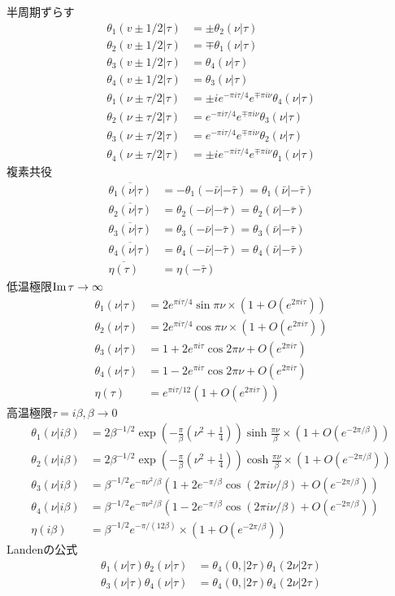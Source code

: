 半周期ずらす
\begin{align}
\theta_1(v\pm 1/2|\tau)&=\pm \theta_2(\nu|\tau)\\
\theta_2(v\pm 1/2|\tau)&=\mp \theta_1(\nu|\tau)\\
\theta_3(v\pm 1/2|\tau)&= \theta_4(\nu|\tau)\\
\theta_4(v\pm 1/2|\tau)&= \theta_3(\nu|\tau)\\
\theta_1(\nu\pm\tau/2|\tau)&=\pm ie^{-\pi i \tau/4}e^{\mp \pi i \nu}\theta_4(\nu|\tau)\\
\theta_2(\nu\pm\tau/2|\tau)&=e^{-\pi i \tau/4}e^{\mp \pi i \nu}\theta_3(\nu|\tau)\\
\theta_3(\nu\pm\tau/2|\tau)&=e^{-\pi i \tau/4}e^{\mp \pi i \nu}\theta_2(\nu|\tau)\\
\theta_4(\nu\pm\tau/2|\tau)&=\pm ie^{-\pi i \tau/4}e^{\mp \pi i \nu}\theta_1(\nu|\tau)
\end{align}
複素共役
\begin{align}
\overline{\theta_1(\nu|\tau)}&=-\theta_1(-\bar{\nu}|-\bar{\tau})=\theta_1(\bar{\nu}|-\bar{\tau})\\
\overline{\theta_2(\nu|\tau)}&=\theta_2(-\bar{\nu}|-\bar{\tau})=\theta_2(\bar{\nu}|-\bar{\tau})\\
\overline{\theta_3(\nu|\tau)}&=\theta_3(-\bar{\nu}|-\bar{\tau})=\theta_3(\bar{\nu}|-\bar{\tau})\\
\overline{\theta_4(\nu|\tau)}&=\theta_4(-\bar{\nu}|-\bar{\tau})=\theta_4(\bar{\nu}|-\bar{\tau})\\
\overline{\eta(\tau)}&=\eta(-\bar{\tau})
\end{align}
低温極限$\text{Im}\,\tau\to\infty$
\begin{align}
\theta_1(\nu|\tau)&= 2e^{\pi i \tau/4}\sin \pi\nu \times(1+O(e^{2\pi i \tau}))\\
\theta_2(\nu|\tau)&= 2e^{\pi i \tau/4}\cos \pi\nu \times(1+O(e^{2\pi i \tau}))\\
\theta_3(\nu|\tau)&= 1+2e^{\pi i \tau}\cos 2\pi\nu +O(e^{2\pi i \tau})\\
\theta_4(\nu|\tau)&= 1-2e^{\pi i \tau}\cos 2\pi\nu +O(e^{2\pi i \tau})\\
\eta(\tau)&=e^{\pi i \tau/12}(1+O(e^{2\pi i \tau}))
\end{align}
高温極限$\tau=i\beta, \beta\to 0$
\begin{align}
\theta_1(\nu|i\beta)&= 2\beta^{-1/2}\exp\left( -\frac{\pi}{\beta}\left(\nu^2+\frac{1}{4}\right) \right)\sinh \frac{\pi \nu}{\beta} \times (1+O(e^{-2\pi/\beta}))\\
\theta_2(\nu|i\beta)&= 2\beta^{-1/2}\exp\left( -\frac{\pi}{\beta}\left(\nu^2+\frac{1}{4}\right) \right)\cosh \frac{\pi \nu}{\beta} \times (1+O(e^{-2\pi/\beta}))\\
\theta_3(\nu|i\beta)&= \beta^{-1/2}e^{-\pi \nu^2/\beta}\left(1+2e^{-\pi/\beta}\cos(2\pi i\nu/\beta)+O(e^{-2\pi/\beta})\right)\\
\theta_4(\nu|i\beta)&= \beta^{-1/2}e^{-\pi \nu^2/\beta}\left(1-2e^{-\pi/\beta}\cos(2\pi i\nu/\beta)+O(e^{-2\pi/\beta})\right)\\
\eta(i\beta)&=\beta^{-1/2}e^{-\pi/(12\beta)}\times (1+O(e^{-2\pi/\beta}))
\end{align}
Landenの公式
\begin{align}
\theta_1(\nu|\tau)\theta_2(\nu|\tau)&=\theta_4(0,|2\tau)\theta_1(2\nu|2\tau)\\
\theta_3(\nu|\tau)\theta_4(\nu|\tau)&=\theta_4(0,|2\tau)\theta_4(2\nu|2\tau)
\end{align}
